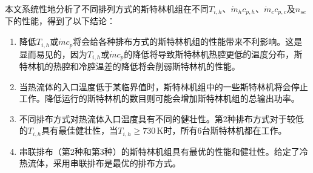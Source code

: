 本文系统性地分析了不同排列方式的斯特林机组在不同$T_{i,h}$、$\dot{m}_hc_{p,h}$、$\dot{m}_cc_{p,c}$及$n_{se}$下的性能，得到了以下结论：

\begin{enumerate}[label=(\arabic*)]
	\item 降低$T_{i,h}$或$\dot{m}c_{p}$将会给各种排布方式的斯特林机组的性能带来不利影响。这是显而易见的，因为$T_{i,h}$或$\dot{m}c_p$的降低将导致斯特林机热腔更低的温度分布，斯特林机的热腔和冷腔温差的降低将会削弱斯特林机的性能。
	\item 当热流体的入口温度低于某临界值时，斯特林机组中的一些斯特林机将会停止工作。降低运行的斯特林机的数目则可能会增加斯特林机组的总输出功率。
	\item 不同排布方式对热流体入口温度具有不同的健壮性。第2种排布方式对于较低的$T_{i,h}$具有最佳健壮性，当$T_{i,h} \geqslant 730\,\mathrm{K}$时，所有6台斯特林机都在工作。
	\item 串联排布（第2种和第3种）的斯特林机组具有最优的性能和健壮性。给定了冷热流体，采用串联排布是最优的排布方式。
\end{enumerate}
